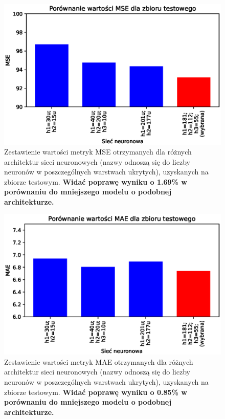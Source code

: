 \documentclass[a4paper,12pt]{article}
\numberwithin{figure}{section}
\begin{document}
    \smallskip

    \begin{figure}[H]
        \centering
        \includegraphics[width=\textwidth]{compr_mse}
        \caption{Zestawienie wartości metryk MSE otrzymanych dla różnych architektur sieci neuronowych (nazwy odnoszą się do liczby neuronów w poszczególnych warstwach ukrytych), uzyskanych na zbiorze testowym. \textbf{    Widać poprawę wyniku o 1.69\% w porównaniu do mniejszego modelu o podobnej architekturze.}}
        \label{fig:compr_mse}
    \end{figure}

    \smallskip

    \begin{figure}[H]
        \centering
        \includegraphics[width=\textwidth]{compr_mae}
        \caption{Zestawienie wartości metryk MAE otrzymanych dla różnych architektur sieci neuronowych (nazwy odnoszą się do liczby neuronów w poszczególnych warstwach ukrytych), uzyskanych na zbiorze testowym. \textbf{Widać poprawę wyniku o 0.85\% w porównaniu do mniejszego modelu o podobnej architekturze.}}
        \label{fig:compr_mae}
    \end{figure}
\end{document}
